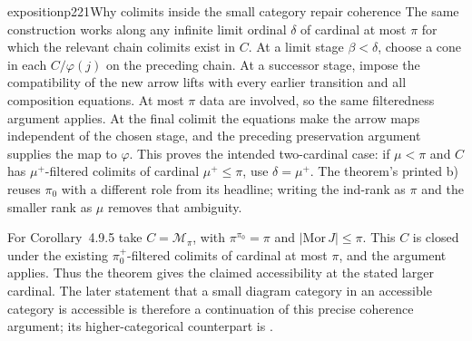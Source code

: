 \begin{dcomment}{exposition}{p221}{Why colimits inside the small category repair coherence}
The same construction works along any infinite limit ordinal $\delta$ of cardinal at most $\pi$ for which the relevant chain colimits exist in $C$. At a limit stage $\beta<\delta$, choose a cone in each $C/\varphi(j)$ on the preceding chain. At a successor stage, impose the compatibility of the new arrow lifts with every earlier transition and all composition equations. At most $\pi$ data are involved, so the same filteredness argument applies. At the final colimit the equations make the arrow maps independent of the chosen stage, and the preceding preservation argument supplies the map to $\varphi$. This proves the intended two-cardinal case: if $\mu<\pi$ and $C$ has $\mu^+$-filtered colimits of cardinal $\mu^+\leq\pi$, use $\delta=\mu^+$. The theorem's printed b) reuses $\pi_0$ with a different role from its headline; writing the ind-rank as $\pi$ and the smaller rank as $\mu$ removes that ambiguity.

For Corollary~4.9.5 take $C=\mathcal M_\pi$, with $\pi^{\pi_0}=\pi$ and $|\mathrm{Mor}\,J|\leq\pi$. This $C$ is closed under the existing $\pi_0^+$-filtered colimits of cardinal at most $\pi$, and the argument applies. Thus the theorem gives the claimed accessibility at the stated larger cardinal. The later statement that a small diagram category in an accessible category is accessible is therefore a continuation of this precise coherence argument; its higher-categorical counterpart is \citet[Proposition~5.4.4.3]{Lurie2009HTT}.
\end{dcomment}

